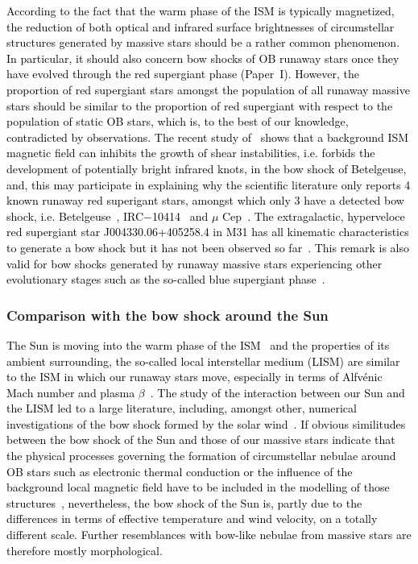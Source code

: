 \documentclass[useAMS,usenatbib]{mn2e}
\begin{document}
\textcolor{black}{
According to the fact that the warm phase of the ISM is typically magnetized, the 
reduction of both optical and infrared surface brightnesses of circumstellar 
structures generated by massive stars should be a rather common phenomenon. In 
particular, it should also concern bow shocks of OB runaway stars once they have 
evolved through the red supergiant phase (Paper~I).
However, the proportion of red supergiant stars amongst the population of all 
runaway massive stars should be similar to the proportion of red supergiant 
with respect to the population of static OB stars, which is, to the best of 
our knowledge, contradicted by observations. The recent study of~\citet{vanmarle_aa_561_2014}
shows that a background ISM magnetic field can inhibits the growth of shear 
instabilities, i.e. forbids the development of potentially bright infrared 
knots, in the bow shock of Betelgeuse, and, this may participate in 
explaining why the scientific literature only reports 4 known runaway red 
superigant stars, amongst which only 3 have a detected bow shock, i.e. 
Betelgeuse~\citep{noriegacrespo_aj_114_1997}, 
IRC$-$10414~\citep{meyer_mnras_439_2014} and $\mu$ 
Cep~\citep{cox_aa_537_2012}. The extragalactic, hyperveloce red supergiant star 
J004330.06+405258.4 in M31 has all kinematic characteristics to generate a bow 
shock but it has not been observed so far~\citep{evans_aj_150_2015}. 
This remark is also valid for bow shocks generated by runaway massive stars 
experiencing other evolutionary stages such as the so-called blue supergiant 
phase~\citep[see, e.g.][]{kaper_apj_475_1997}. 
}


\subsubsection{Comparison with the bow shock around the Sun}
\label{sect:sun}


\textcolor{black}{
The Sun is moving into the warm phase of the ISM~\citep{mccomas_apj_801_2015} 
and the properties of its ambient surrounding, the so-called local interstellar 
medium (LISM) are similar to the ISM in which our runaway stars move, especially 
in terms of Alfv\' enic Mach number and plasma 
$\beta$~\citep{florinski_apj_604_2004,burlaga_apj_804_2015}. The study of the 
interaction between our Sun and the LISM led to a large literature, including, 
amongst other, numerical investigations of the bow shock formed by the solar 
wind~\citep[see, e.g.][and references 
therein]{pogorelov_JGR_103_1998,baranov_jgr_1993,zank_araa_53_2015}. If obvious similitudes between the 
bow shock of the Sun and those of our massive stars indicate that the physical 
processes governing the formation of circumstellar nebulae around OB stars such 
as electronic thermal conduction or the influence of the background local 
magnetic field have to be included in the modelling of those 
structures~\citep{zank_ssrv_146_2009}, nevertheless, the bow shock of the Sun 
is, partly due to the differences in terms of effective temperature and wind 
velocity, on a totally different scale. Further resemblances with bow-like 
nebulae from massive stars are therefore mostly morphological. 
}
\end{document}
